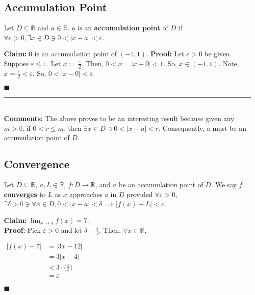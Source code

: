 \documentclass[11pt]{book}
\newcommand{\R}{\mathbb{R}}
\newcommand{\horline}{\noindent\rule{14.25cm}{0.6pt}\\}
\newcommand{\QED}{\begin{flushright}$\blacksquare$\end{flushright}}
\begin{document}
	\subsection{Accumulation Point}
		\begin{defin}
			Let $D \subseteq \R$ and $a \in \R$. $a$ is an \textbf{accumulation point} of $D$ if $\forall \varepsilon > 0,
			\exists x \in D \ni 0 < |x - a | < \varepsilon$.
		\end{defin}
		\begin{examp}
			\textbf{Claim:} 0 is an accumulation point of $(-1,1)$.\hfill\break
			\textbf{Proof:} Let $\varepsilon > 0$ be given. Suppose $\varepsilon \leq 1$. Let $x := \frac{\varepsilon}{2}$.
			Then, $0 < x = |x - 0| < 1$. So, $x \in (-1,1)$. Note, $x = \frac{\varepsilon}{2} < \varepsilon$. So, 
			$0 < |x - 0| < \varepsilon$. \QED
			\horline
			\textbf{Comments:} The above proves to be an interesting result because given any $m > 0$, if $0 < r \leq m$, 
			then $\exists x \in D \ni 0 < |x - a| < r$. Consequently, $a$ must be an accumulation point of $D$.
		\end{examp}
	\subsection{Convergence}
		\begin{defin}
			Let $D \subseteq \R$, $a,L \in \R$, $f: D \to \R$, and $a$ be an accumulation point of $D$. We say $f$
			\textbf{converges} to $L$ as $x$ approaches $a$ in $D$ provided $\forall \varepsilon > 0$, $\exists \delta > 0 \ni
			\forall x \in D, 0 < |x - a| < \delta \implies |f(x) - L| < \varepsilon$.
		\end{defin}
		\begin{examp}
			\textbf{Claim:} $\displaystyle\lim_{x \to 4}{f(x) = 7}$.\\
			\textbf{Proof:} Pick $\varepsilon > 0$ and let $\delta - \frac{\varepsilon}{3}$. Then, $\forall x \in \R$,
				\begin{center}
					\begin{math}
						\begin{aligned}
							|f(x) - 7| & = |3x - 12|\\
							& = 3|x - 4|\\
							& < 3\cdot\bigg(\frac{\varepsilon}{3}\bigg)\\
							& = \varepsilon
						\end{aligned}
					\end{math}
				\end{center}
				\QED
		\end{examp}
\end{document}
